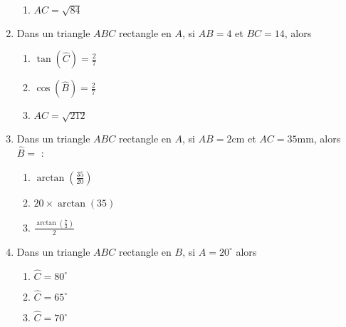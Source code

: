 \documentclass[oneside,twoside]{book}
\begin{document}
\begin{enumerate}
\begin{enumerate}
\item\BonneReponse $AC=\sqrt{84}$

\end{enumerate}



\item Dans un triangle $ABC$ rectangle en $A$, si $AB=4$ et $BC=14$, alors

\begin{enumerate}

\item\MauvaiseReponse $\tan (\hat{C})=\frac{2}{7}$

\item\BonneReponse $\cos (\hat{B})=\frac{2}{7}$

\item\MauvaiseReponse $AC=\sqrt{212}$


\end{enumerate}



\item Dans un triangle $ABC$ rectangle en $A$, si $AB=2\mathrm{cm}$ et $AC=35\mathrm{mm}$, alors $\hat{B}=$ :

\begin{enumerate}

\item\BonneReponse $\arctan\left(\frac{35}{20}\right)$

\item\MauvaiseReponse $20\times\arctan\left(35\right)$


\item\MauvaiseReponse $\frac{\arctan\left(\frac{7}{2}\right)}{2}$

\end{enumerate}



\item Dans un triangle $ABC$ rectangle en $B$, si $\widehat{A}=20^{\circ}$ alors

\begin{enumerate}

\item\MauvaiseReponse $\widehat{C}=80^{\circ}$

\item\MauvaiseReponse $\widehat{C}=65^{\circ}$

\item\BonneReponse $\widehat{C}=70^{\circ}$

\end{enumerate}




\end{enumerate}
\end{document}
